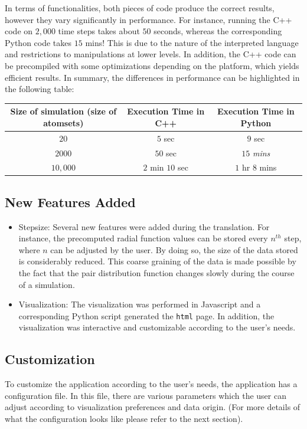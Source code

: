 \doublespacing
In terms of functionalities, both pieces of code produce the correct results, however they vary significantly in performance. For instance, running the C++ code on $2,000$ time steps takes about $50$ seconds, whereas the corresponding Python code takes $15$ mins! This is due to the nature of the interpreted language and restrictions to manipulations at lower levels. In addition, the C++ code can be precompiled with some optimizations depending on the platform, which yields efficient results. In summary, the differences in performance can be highlighted in the following table:

\begin{center}
\begin{tabular}{ |c|c|c| } 
\hline
 Size of simulation (size of atomsets) &  Execution Time in C++ &  Execution Time in Python  \\
 \hline
 $20$ & $5$ sec & $9$ sec \\ 
 \hline
 $2000$ & $50$ sec & $15$ \textit{mins} \\ 
 \hline
 $10,000$ & $2$ min $10$ sec & $1$ hr $8$ mins \\ 
 \hline
\end{tabular}
\end{center}


\subsection*{New Features Added}

\begin{itemize}

\item Stepsize: Several new features were added during the translation. For instance, the precomputed radial function values can be stored every $n^{th}$ step, where $n$ can be adjusted by the user. By doing so, the size of the data stored is considerably reduced. This coarse graining of the data is made possible by the fact that the pair distribution function changes slowly during the course of a simulation.

\item Visualization: The visualization was performed in Javascript and a corresponding Python script generated the \verb|html| page. In addition, the visualization was interactive and customizable according to the user's needs.

\end{itemize}

\subsection*{Customization}

To customize the application according to the user's needs, the application has a configuration file. In this file, there are various parameters which the user can adjust according to visualization preferences and data origin. (For more details of what the configuration looks like please refer to the next section).



